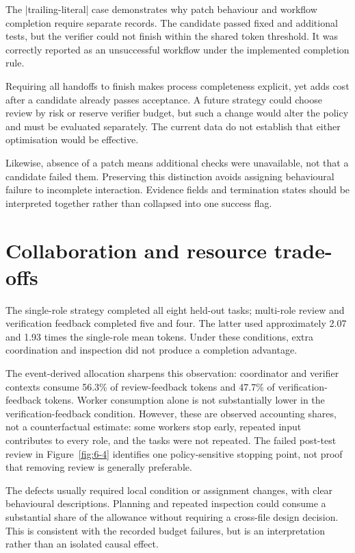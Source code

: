The \code|trailing-literal| case demonstrates why patch behaviour and workflow completion require separate records. The candidate passed fixed and additional tests, but the verifier could not finish within the shared token threshold. It was correctly reported as an unsuccessful workflow under the implemented completion rule.

Requiring all handoffs to finish makes process completeness explicit, yet adds cost after a candidate already passes acceptance. A future strategy could choose review by risk or reserve verifier budget, but such a change would alter the policy and must be evaluated separately. The current data do not establish that either optimisation would be effective.

Likewise, absence of a patch means additional checks were unavailable, not that a candidate failed them. Preserving this distinction avoids assigning behavioural failure to incomplete interaction. Evidence fields and termination states should be interpreted together rather than collapsed into one success flag.

\section{Collaboration and resource trade-offs}\label{sec:7.3}

The single-role strategy completed all eight held-out tasks; multi-role review and verification feedback completed five and four. The latter used approximately 2.07 and 1.93 times the single-role mean tokens. Under these conditions, extra coordination and inspection did not produce a completion advantage.

The event-derived allocation sharpens this observation: coordinator and verifier contexts consume 56.3\% of review-feedback tokens and 47.7\% of verification-feedback tokens. Worker consumption alone is not substantially lower in the verification-feedback condition. However, these are observed accounting shares, not a counterfactual estimate: some workers stop early, repeated input contributes to every role, and the tasks were not repeated. The failed post-test review in Figure~\ref{fig:6-4} identifies one policy-sensitive stopping point, not proof that removing review is generally preferable.

The defects usually required local condition or assignment changes, with clear behavioural descriptions. Planning and repeated inspection could consume a substantial share of the allowance without requiring a cross-file design decision. This is consistent with the recorded budget failures, but is an interpretation rather than an isolated causal effect.

